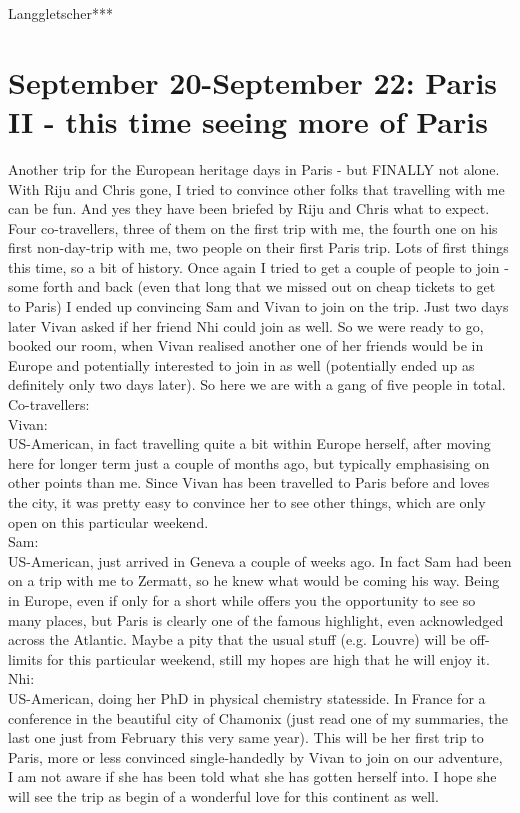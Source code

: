 Langgletscher***

\section{September 20-September 22: Paris II - this time seeing more of Paris}
\label{2019:Paris II}

Another trip for the European heritage days in Paris - but FINALLY not alone. With Riju and Chris gone, I tried to convince other folks that travelling with me can be fun. And yes they have been briefed by Riju and Chris what to expect. Four co-travellers, three of them on the first trip with me, the fourth one on his first non-day-trip with me, two people on their first Paris trip. Lots of first things this time, so a bit of history. Once again I tried to get a couple of people to join - some forth and back (even that long that we missed out on cheap tickets to get to Paris) I ended up convincing Sam and Vivan to join on the trip. Just two days later Vivan asked if her friend Nhi could join as well. So we were ready to go, booked our room, when Vivan realised another one of her friends would be in Europe and potentially interested to join in as well (potentially ended up as definitely only two days later). So here we are with a gang of five people in total.\\

Co-travellers: \\
Vivan:\\
US-American, in fact travelling quite a bit within Europe herself, after moving here for longer term just a couple of months ago, but typically emphasising on other points than me. Since Vivan has been travelled to Paris before and loves the city, it was pretty easy to convince her to see other things, which are only open on this particular weekend.\\

Sam:\\
US-American, just arrived in Geneva a couple of weeks ago. In fact Sam had been on a trip with me to Zermatt, so he knew what would be coming his way. Being in Europe, even if only for a short while offers you the opportunity to see so many places, but Paris is clearly one of the famous highlight, even acknowledged across the Atlantic. Maybe a pity that the usual stuff (e.g. Louvre) will be off-limits for this particular weekend, still my hopes are high that he will enjoy it.\\

Nhi:\\
US-American, doing her PhD in physical chemistry statesside. In France for a conference in the beautiful city of Chamonix (just read one of my summaries, the last one just from February this very same year). This will be her first trip to Paris, more or less convinced single-handedly by Vivan to join on our adventure, I am not aware if she has been told what she has gotten herself into. I hope she will see the trip as begin of a wonderful love for this continent as well. \\

